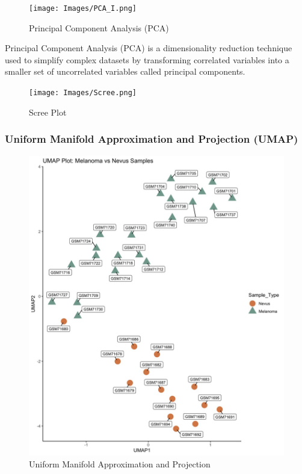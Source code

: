 \documentclass[
]{article}
\begin{document}
\begin{figure}

{\centering \texttt{[image: Images/PCA\_I.png]} 

}

\caption{Principal Component Analysis (PCA)}\label{fig:unnamed-chunk-27}
\end{figure}

Principal Component Analysis (PCA) is a dimensionality reduction
technique used to simplify complex datasets by transforming correlated
variables into a smaller set of uncorrelated variables called principal
components.

\begin{figure}

{\centering \texttt{[image: Images/Scree.png]} 

}

\caption{Scree Plot}\label{fig:unnamed-chunk-28}
\end{figure}
\newpage

\subsubsection{Uniform Manifold Approximation and Projection
(UMAP)}\label{uniform-manifold-approximation-and-projection-umap}

\begin{figure}

{\centering \includegraphics[width=0.8\linewidth]{Images/Umap} 

}

\caption{Uniform Manifold Approximation and Projection}\label{fig:unnamed-chunk-29}
\end{figure}
\end{document}
